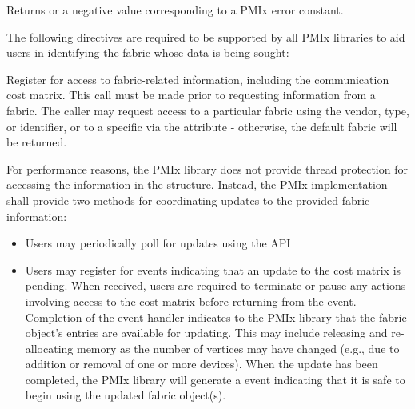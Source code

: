 \begin{arglist}
\end{arglist}

Returns  or a negative value corresponding to a \ac{PMIx} error constant.

\reqattrstart
The following directives are required to be supported by all \ac{PMIx} libraries to aid users in identifying the fabric whose data is being sought:


\reqattrend

\descr

Register for access to fabric-related information, including the communication cost matrix. This call must be made prior to requesting information from a fabric. The caller may request access to a particular fabric using the vendor, type, or identifier, or to a specific  via the  attribute - otherwise, the default fabric will be returned.

For performance reasons, the \ac{PMIx} library does not provide thread protection for accessing the information in the  structure. Instead, the \ac{PMIx} implementation shall provide two methods for coordinating updates to the provided fabric information:

\begin{itemize}

    \item Users may periodically poll for updates using the  \ac{API}

    \item Users may register for  events indicating that an update to the cost matrix is pending. When received, users are required to terminate or pause any actions involving access to the cost matrix before returning from the event. Completion of the  event handler indicates to the \ac{PMIx} library that the fabric object's entries are available for updating. This may include releasing and re-allocating memory as the number of vertices may have changed (e.g., due to addition or removal of one or more devices). When the update has been completed, the \ac{PMIx} library will generate a  event indicating that it is safe to begin using the updated fabric object(s).

\end{itemize}

